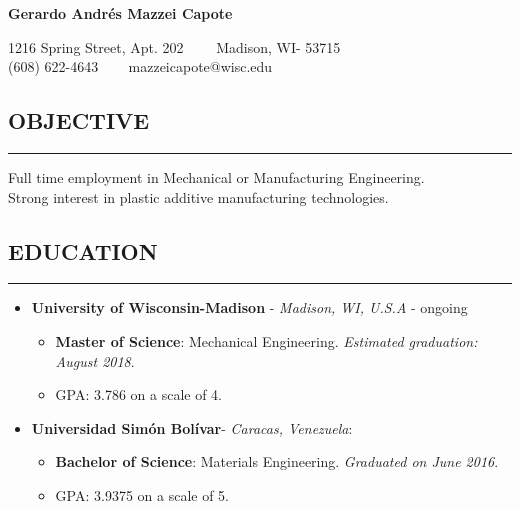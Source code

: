 \documentclass[11pt,letterpaper]{article}
\newenvironment{indentsection}[1]%
{\begin{list}{}%
	{\setlength{\leftmargin}{#1}}%
	\item[]%
}
{\end{list}}
\begin{document}
	\thispagestyle{firststyle}
	
\begin{center}
	{\LARGE \textbf{Gerardo Andrés Mazzei Capote}}

	1216 Spring Street, Apt. 202\ \ \textbullet
	\ \ Madison, WI- 53715
	\\
	(608) 622-4643 \ \textbullet
	\ \ mazzeicapote@wisc.edu
\end{center}

\vspace{-1em}

\subsection*{OBJECTIVE}
	\vspace{-0.5em}
	\hrule
	\vspace{0.4em}
	\begin{indentsection}{\parindent}
		Full time employment in Mechanical or Manufacturing Engineering.\\
		Strong interest in plastic additive manufacturing technologies.
	\end{indentsection}


\subsection*{EDUCATION}
	\vspace{-0.5em}
	\hrule
	\vspace{0.4em}
	\begin{itemize}
	\item
	\textbf{University of Wisconsin-Madison} - \emph{Madison, WI, U.S.A} - ongoing
	\begin{itemize}	
	\item
	\textbf{Master of Science}: Mechanical Engineering. \emph{Estimated graduation: August 2018}.
	\item
	GPA: 3.786 on a scale of 4.
\end{itemize}

	\item
	\textbf{Universidad Simón Bolívar}- \emph{Caracas, Venezuela}:
	\begin{itemize}	
		\item
		\textbf{Bachelor of Science}: Materials Engineering. \emph{Graduated on June 2016}.
		\item
		GPA: 3.9375 on a scale of 5.
	\end{itemize}
	\end{itemize}
\end{document}
